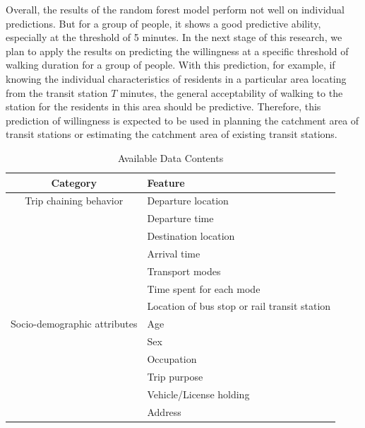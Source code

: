 \documentclass[Journal,letterpaper]{ascelike-new}
\begin{document}
%
Overall, the results of the random forest model perform not well on individual predictions. But for a group of people, it shows a good predictive ability, especially at the threshold of 5 minutes. In the next stage of this research, we plan to apply the results on predicting the willingness at a specific threshold of walking duration for a group of people. With this prediction, for example, if knowing the individual characteristics of residents in a particular area locating from the transit station $T$ minutes, the general acceptability of walking to the station for the residents in this area should be predictive. Therefore, this prediction of willingness is expected to be used in planning the catchment area of transit stations or estimating the catchment area of existing transit stations.



%
\begin{table}[htbp]
    \centering
    \caption{Available Data Contents}
    \label{table:1}
    \begin{tabular}{cl}
    \hline\hline
      Category                      & Feature\\
    \hline
      Trip chaining behavior        & Departure location \\
                                    & Departure time \\
                                    & Destination location \\
                                    & Arrival time \\
                                    & Transport modes \\
                                    & Time spent for each mode \\
                                    & Location of bus stop or rail transit station \\
      Socio-demographic attributes  & Age \\
                                    & Sex \\
                                    & Occupation \\
                                    & Trip purpose \\
                                    & Vehicle/License holding \\
                                    & Address \\
    \hline\hline
    \end{tabular}
    \normalsize
\end{table}
%
\end{document}
